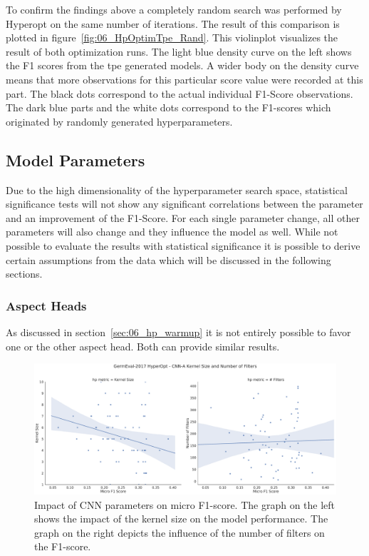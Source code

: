 To confirm the findings above a completely random search was performed by Hyperopt on the same number of iterations. The result of this comparison is plotted in figure~\ref{fig:06_HpOptimTpe_Rand}. This violinplot visualizes the result of both optimization runs. The light blue density curve on the left shows the F1 scores from the \gls{tpe} generated models. A wider body on the density curve means that more observations for this particular score value were recorded at this part. The black dots correspond to the actual individual F1-Score observations. The dark blue parts and the white dots correspond to the F1-scores which originated by randomly generated hyperparameters.

\subsection{Model Parameters}

Due to the high dimensionality of the hyperparameter search space, statistical significance tests will not show any significant correlations between the parameter and an improvement of the F1-Score. For each single parameter change, all other parameters will also change and they influence the model as well. While not possible to evaluate the results with statistical significance it is possible to derive certain assumptions from the data which will be discussed in the following sections.

\subsubsection{Aspect Heads}

As discussed in section~\ref{sec:06_hp_warmup} it is not entirely possible to favor one or the other aspect head. Both can provide similar results. 

\begin{figure}[ht]
	\centering
	\includegraphics[width=\textwidth]{figures/06_results/06_hp_ge_lm_cnnParams_test}
	\caption{Impact of CNN parameters on micro F1-score. The graph on the left shows the impact of the kernel size on the model performance. The graph on the right depicts the influence of the number of filters on the F1-score.}
	\label{fig:06_HpOptim_CnnParams}
\end{figure}

